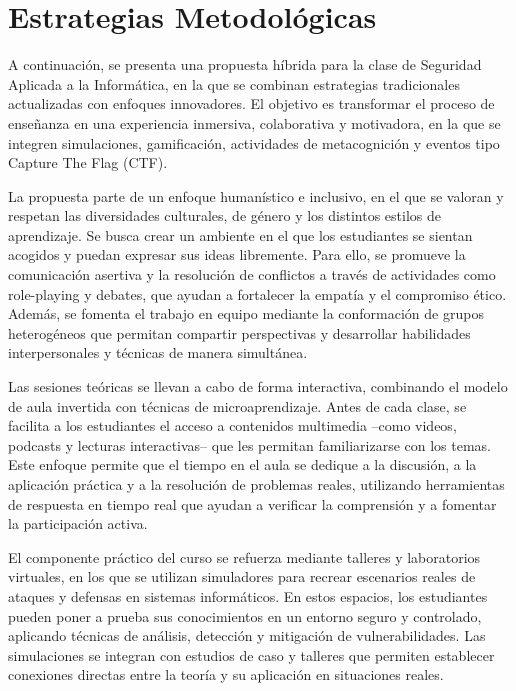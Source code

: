 \section{Estrategias Metodológicas}


A continuación, se presenta una propuesta híbrida para la clase de Seguridad Aplicada a la Informática, en la que se combinan estrategias tradicionales actualizadas con enfoques innovadores. El objetivo es transformar el proceso de enseñanza en una experiencia inmersiva, colaborativa y motivadora, en la que se integren simulaciones, gamificación, actividades de metacognición y eventos tipo Capture The Flag (CTF).

La propuesta parte de un enfoque humanístico e inclusivo, en el que se valoran y respetan las diversidades culturales, de género y los distintos estilos de aprendizaje. Se busca crear un ambiente en el que los estudiantes se sientan acogidos y puedan expresar sus ideas libremente. Para ello, se promueve la comunicación asertiva y la resolución de conflictos a través de actividades como role-playing y debates, que ayudan a fortalecer la empatía y el compromiso ético. Además, se fomenta el trabajo en equipo mediante la conformación de grupos heterogéneos que permitan compartir perspectivas y desarrollar habilidades interpersonales y técnicas de manera simultánea.

Las sesiones teóricas se llevan a cabo de forma interactiva, combinando el modelo de aula invertida con técnicas de microaprendizaje. Antes de cada clase, se facilita a los estudiantes el acceso a contenidos multimedia –como videos, podcasts y lecturas interactivas– que les permitan familiarizarse con los temas. Este enfoque permite que el tiempo en el aula se dedique a la discusión, a la aplicación práctica y a la resolución de problemas reales, utilizando herramientas de respuesta en tiempo real que ayudan a verificar la comprensión y a fomentar la participación activa.

El componente práctico del curso se refuerza mediante talleres y laboratorios virtuales, en los que se utilizan simuladores para recrear escenarios reales de ataques y defensas en sistemas informáticos. En estos espacios, los estudiantes pueden poner a prueba sus conocimientos en un entorno seguro y controlado, aplicando técnicas de análisis, detección y mitigación de vulnerabilidades. Las simulaciones se integran con estudios de caso y talleres que permiten establecer conexiones directas entre la teoría y su aplicación en situaciones reales.

